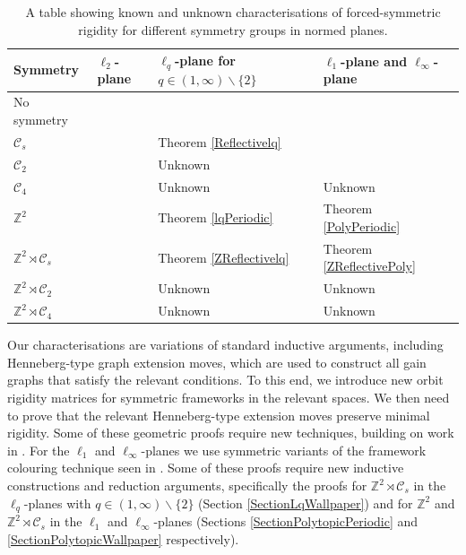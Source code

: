\documentclass[reqno,a4paper,10pt]{article}
\theoremstyle{definition}
\theoremstyle{remark}
\numberwithin{equation}{section}
\numberwithin{figure}{section}
\numberwithin{table}{section}
\newcommand{\Z}{\mathbb{Z}}
\begin{document}
    \begin{table}[H]
        \begin{center}
        \begin{tabular}{|l||l|l|l|}
        \hline
        Symmetry&$\ell_2$-plane&$\ell_q$-plane for $q\in(1,\infty)\backslash\{2\}$&$\ell_1$-plane and $\ell_\infty$-plane\\
        \hline
        No symmetry&\cite{Pollaczek-Geiringer}\cite{Laman}&\cite[Theorem 3.6]{NonEuclidean}&\cite[Theorem 4.10]{NonEuclidean}\\
        $\mathcal{C}_s$&\cite[Theorem 2]{MalesteinSymmetry}&Theorem \ref{Reflectivelq}&\cite[Theorem 22]{GridLike}\\
        $\mathcal{C}_2$&\cite[Theorem 1]{MalesteinSymmetry}&Unknown&\cite[Theorem 4.3]{KitsonSymmetricNormed}\\
        $\mathcal{C}_4$&\cite[Theorem 1]{MalesteinSymmetry}&Unknown&Unknown\\
        $\Z^2$&\cite[Theorem 5.1]{Inductive}&Theorem \ref{lqPeriodic}&Theorem \ref{PolyPeriodic}\\
        $\Z^2\rtimes\mathcal{C}_s$&\cite[Theorem 3.2]{EssonCrystallographic}&Theorem \ref{ZReflectivelq}&Theorem \ref{ZReflectivePoly}\\
        $\Z^2\rtimes\mathcal{C}_2$&\cite[Theorem 5.10]{BernsteinRotations}&Unknown&Unknown\\
        $\Z^2\rtimes\mathcal{C}_4$&\cite[Theorem 5.10]{BernsteinRotations}&Unknown&Unknown\\
        \hline
    \end{tabular}
    \end{center}
    \caption{A table showing known and unknown characterisations of forced-symmetric rigidity for different symmetry groups in  normed planes.}
    \label{TableSymmetry}
    \end{table}

    Our characterisations are  variations of standard inductive arguments, including Henneberg-type graph extension moves, which are used to construct all gain graphs that satisfy the relevant conditions. To this end, we introduce new orbit rigidity matrices for symmetric frameworks in the relevant spaces. We then need to prove that the relevant Henneberg-type extension moves preserve minimal rigidity. Some of these geometric proofs require new techniques, building on work in \cite{NonEuclidean,EGRES,Surfaces, Inductive}. For the $\ell_1$ and $\ell_\infty$-planes we use symmetric variants of the framework colouring technique seen in \cite{KitsonSymmetricNormed, NonEuclidean,GridLike}. Some of these proofs require new inductive constructions and reduction arguments, specifically the proofs for $\Z^2\rtimes\mathcal{C}_s$ in the $\ell_q$-planes with $q\in(1,\infty)\backslash\{2\}$ (Section \ref{SectionLqWallpaper}) and for $\Z^2$ and $\Z^2\rtimes\mathcal{C}_s$ in the $\ell_1$ and $\ell_\infty$-planes (Sections \ref{SectionPolytopicPeriodic} and \ref{SectionPolytopicWallpaper} respectively). 
\end{document}
